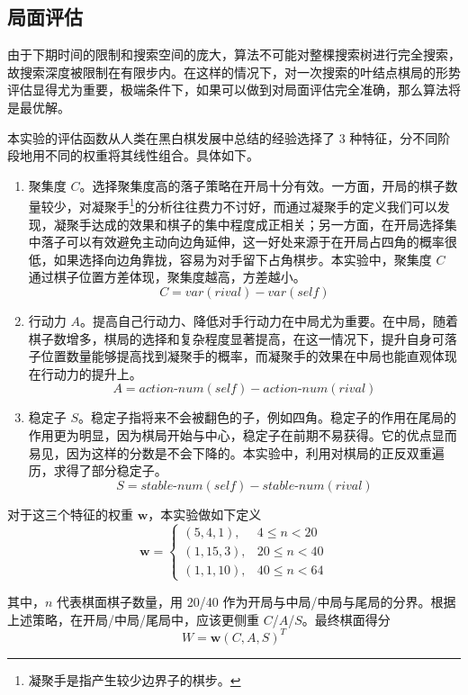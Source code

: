 \documentclass{zjureport-zh}
\begin{document}
\subsection{局面评估}
\par 由于下期时间的限制和搜索空间的庞大，算法不可能对整棵搜索树进行完全搜索，故搜索深度被限制在有限步内。在这样的情况下，对一次搜索的叶结点棋局的形势评估显得尤为重要，极端条件下，如果可以做到对局面评估完全准确，那么算法将是最优解。
\par 本实验的评估函数从人类在黑白棋发展中总结的经验选择了 3 种特征，分不同阶段地用不同的权重将其线性组合。具体如下。
\begin{enumerate}
	\item 聚集度 $C$。选择聚集度高的落子策略在开局十分有效。一方面，开局的棋子数量较少，对凝聚手\footnote{凝聚手是指产生较少边界子的棋步。}的分析往往费力不讨好，而通过凝聚手的定义我们可以发现，凝聚手达成的效果和棋子的集中程度成正相关；另一方面，在开局选择集中落子可以有效避免主动向边角延伸，这一好处来源于在开局占四角的概率很低，如果选择向边角靠拢，容易为对手留下占角棋步。本实验中，聚集度 $C$ 通过棋子位置方差体现，聚集度越高，方差越小。
	$$ C = var(rival) - var(self) $$
	\item 行动力 $A$。提高自己行动力、降低对手行动力在中局尤为重要。在中局，随着棋子数增多，棋局的选择和复杂程度显著提高，在这一情况下，提升自身可落子位置数量能够提高找到凝聚手的概率，而凝聚手的效果在中局也能直观体现在行动力的提升上。
	$$ A = action\textit{-}num(self) - action\textit{-}num(rival) $$
	\item 稳定子 $S$。稳定子指将来不会被翻色的子，例如四角。稳定子的作用在尾局的作用更为明显，因为棋局开始与中心，稳定子在前期不易获得。它的优点显而易见，因为这样的分数是不会下降的。本实验中，利用对棋局的正反双重遍历，求得了部分稳定子。
	$$ S = stable\textit{-}num(self) - stable\textit{-}num(rival) $$
\end{enumerate}
\par 对于这三个特征的权重 $\bm{w}$，本实验做如下定义
\begin{equation} \label{w}
	\bm{w} =
	\begin{cases}
		(5, 4, 1), & 4 \leq n < 20 \\
		(1, 15, 3), & 20 \leq n < 40 \\
		(1, 1, 10), & 40 \leq n < 64
	\end{cases}
\end{equation}
\par 其中，$n$ 代表棋面棋子数量，用 20/40 作为开局与中局/中局与尾局的分界。根据上述策略，在开局/中局/尾局中，应该更侧重 $C$/$A$/$S$。最终棋面得分 
$$ W = \bm{w}(C, A, S)^T $$
\end{document}
